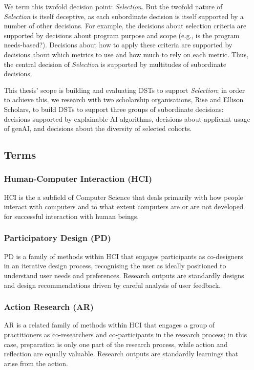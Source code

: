 We term this twofold decision point: \emph{Selection}. But the twofold nature of \emph{Selection} is itself deceptive, as each subordinate decision is itself supported by a number of other decisions. For example, the decisions about selection criteria are supported by decisions about program purpose and scope (e.g., is the program needs-based?). Decisions about how to apply these criteria are supported by decisions about which metrics to use and how much to rely on each metric. Thus, the central decision of \emph{Selection} is supported by multitudes of subordinate decisions. 

This thesis' scope is building and evaluating DSTs to support \emph{Selection}; in order to achieve this, we research with two scholarship organisations, Rise and Ellison Scholars, to build DSTs to support three groups of subordinate decisions: decisions supported by explainable AI algorithms, decisions about applicant usage of genAI, and decisions about the diversity of selected cohorts.

\subsection{Terms}
\subsubsection{Human-Computer Interaction (HCI)}
HCI is the a subfield of Computer Science that deals primarily with how people interact with computers and to what extent computers are or are not developed for successful interaction with human beings.

\subsubsection{Participatory Design (PD)}
PD is a family of methods within HCI that engages participants as co-designers in an iterative design process, recognising the user as ideally positioned to understand user needs and preferences. Research outputs are standardly designs and design recommendations driven by careful analysis of user feedback.

\subsubsection{Action Research (AR)}
AR is a related family of methods within HCI that engages a group of practitioners as co-researchers and co-participants in the research process; in this case, preparation is only one part of the research process, while action and reflection are equally valuable. Research outputs are standardly learnings that arise from the action.

